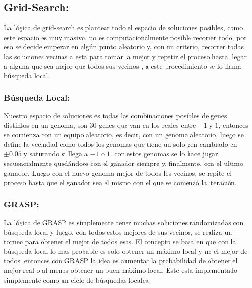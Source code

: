 \subsection{Grid-Search:}

La lógica de grid-search es plantear todo el espacio de soluciones posibles, como este espacio
es muy masivo, no es computacionalmente posible recorrer todo, por eso se decide empezar
en algún punto aleatorio y, con un criterio, recorrer todas las soluciones vecinas a esta
para tomar la mejor y repetir el proceso hasta llegar a alguna que sea mejor que todos sus vecinos
, a este procedimiento se lo llama búsqueda local.


\subsubsection{Búsqueda Local:}


Nuestro espacio de soluciones es todas las combinaciones posibles de genes distintos en un genoma,
son 30 genes que van en los reales entre $-1$ y $1$, entonces se comienza con un equipo aleatorio,
es decir, con un genoma aleatorio, luego se define la vecindad como todos los genomas que tiene
un solo gen cambiado en $\pm 0.05$ y saturando si llega a $-1$ o $1$. con estos genomas se lo hace
jugar secuencialmente quedándose con el ganador siempre y, finalmente, con el ultimo ganador.
Luego con el nuevo genoma mejor de todos los vecinos, se repite el proceso hasta que el ganador
sea el mismo con el que se comenzó la iteración.


\subsubsection{GRASP:}


La lógica de GRASP es simplemente tener muchas soluciones randomizadas con búsqueda local y luego, con todos
estos mejores de sus vecinos, se realiza un torneo para obtener el mejor de todos esos.
El concepto se basa en que con la búsqueda local lo mas probable es solo obtener un máximo local y no
el mejor de todos, entonces con GRASP la idea es aumentar la probabilidad de obtener el mejor real o
al menos obtener un buen máximo local.
Este esta implementado simplemente como un ciclo de búsquedas locales.
